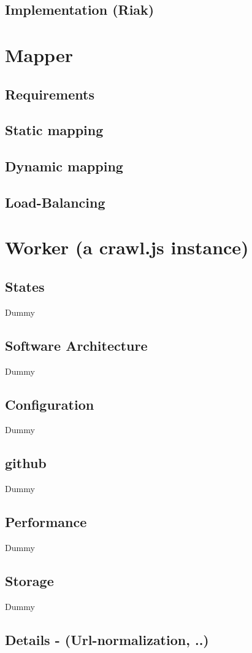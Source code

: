 \subsection{Implementation (Riak)}

\section{Mapper}
\subsection{Requirements}
\subsection{Static mapping}
\subsection{Dynamic mapping}
\subsection{Load-Balancing}

\section{Worker (a crawl.js instance)}
\subsection{States}
Dummy
\subsection{Software Architecture}
Dummy
\subsection{Configuration}
Dummy
\subsection{github}
Dummy
\subsection{Performance}
Dummy
\subsection{Storage}
Dummy
\subsection{Details - (Url-normalization, ..)}

